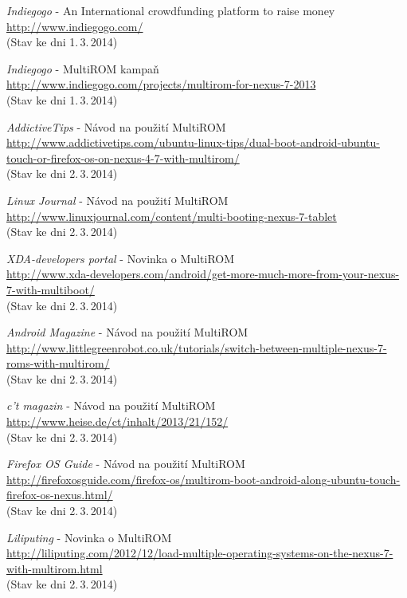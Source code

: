 \documentclass[12pt, a4paper, oneside]{article}
\newcommand{\It}{\textit}  %
\begin{document}
\begin{thebibliography}{99}
     \It{Indiegogo} - An International crowdfunding platform to raise money\\
    \url{http://www.indiegogo.com/}\\
    (Stav ke dni 1.\,3.\,2014)

     \It{Indiegogo} - MultiROM kampaň\\
    \url{http://www.indiegogo.com/projects/multirom-for-nexus-7-2013}\\
    (Stav ke dni 1.\,3.\,2014)

     \It{AddictiveTips} - Návod na použití MultiROM\\
    \url{http://www.addictivetips.com/ubuntu-linux-tips/dual-boot-android-ubuntu-touch-or-firefox-os-on-nexus-4-7-with-multirom/}\\
    (Stav ke dni 2.\,3.\,2014)

     \It{Linux Journal} - Návod na použití MultiROM\\
    \url{http://www.linuxjournal.com/content/multi-booting-nexus-7-tablet}\\
    (Stav ke dni 2.\,3.\,2014)

     \It{XDA-developers portal} - Novinka o MultiROM\\
    \url{http://www.xda-developers.com/android/get-more-much-more-from-your-nexus-7-with-multiboot/}\\
    (Stav ke dni 2.\,3.\,2014)

     \It{Android Magazine} - Návod na použití MultiROM\\
    \url{http://www.littlegreenrobot.co.uk/tutorials/switch-between-multiple-nexus-7-roms-with-multirom/}\\
    (Stav ke dni 2.\,3.\,2014)

     \It{c't magazin} - Návod na použití MultiROM\\
    \url{http://www.heise.de/ct/inhalt/2013/21/152/}\\
    (Stav ke dni 2.\,3.\,2014)

     \It{Firefox OS Guide} - Návod na použití MultiROM\\
    \url{http://firefoxosguide.com/firefox-os/multirom-boot-android-along-ubuntu-touch-firefox-os-nexus.html/}\\
    (Stav ke dni 2.\,3.\,2014)

     \It{Liliputing} - Novinka o MultiROM\\
    \url{http://liliputing.com/2012/12/load-multiple-operating-systems-on-the-nexus-7-with-multirom.html}\\
    (Stav ke dni 2.\,3.\,2014)


\end{thebibliography}
\end{document}
